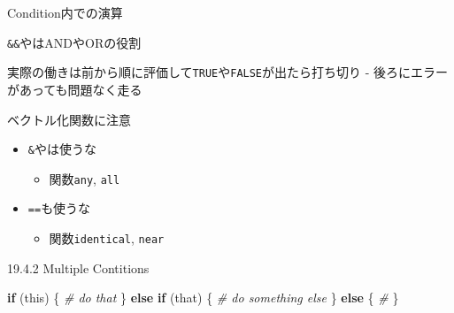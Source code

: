 \documentclass[ignorenonframetext,]{beamer}
\newenvironment{Shaded}{\begin{snugshade}}{\end{snugshade}}
\newcommand{\CommentTok}[1]{\textcolor[rgb]{0.56,0.35,0.01}{\textit{#1}}}
\newcommand{\ControlFlowTok}[1]{\textcolor[rgb]{0.13,0.29,0.53}{\textbf{#1}}}
\newcommand{\NormalTok}[1]{#1}
\providecommand{\tightlist}{%
  \setlength{\itemsep}{0pt}\setlength{\parskip}{0pt}}
\begin{document}
\begin{frame}[fragile]{Condition内での演算}

\begin{block}{\texttt{\&\&}や\texttt{\textbar{}\textbar{}}はANDやORの役割}

実際の働きは前から順に評価して\texttt{TRUE}や\texttt{FALSE}が出たら打ち切り
- 後ろにエラーがあっても問題なく走る

\end{block}

\begin{block}{ベクトル化関数に注意}

\begin{itemize}
\tightlist
\item
  \texttt{\&}や\texttt{\textbar{}}は使うな

  \begin{itemize}
  \tightlist
  \item
    関数\texttt{any}, \texttt{all}
  \end{itemize}
\item
  \texttt{==}も使うな

  \begin{itemize}
  \tightlist
  \item
    関数\texttt{identical}, \texttt{near}
  \end{itemize}
\end{itemize}

\end{block}

\end{frame}

\begin{frame}[fragile]{19.4.2 Multiple Contitions}

\begin{Shaded}
\begin{Highlighting}[]
\ControlFlowTok{if}\NormalTok{ (this) \{}
    \CommentTok{# do that}
\NormalTok{\} }\ControlFlowTok{else} \ControlFlowTok{if}\NormalTok{ (that) \{}
    \CommentTok{# do something else}
\NormalTok{\} }\ControlFlowTok{else}\NormalTok{ \{}
    \CommentTok{# }
\NormalTok{\}}
\end{Highlighting}
\end{Shaded}

\end{frame}
\end{document}

